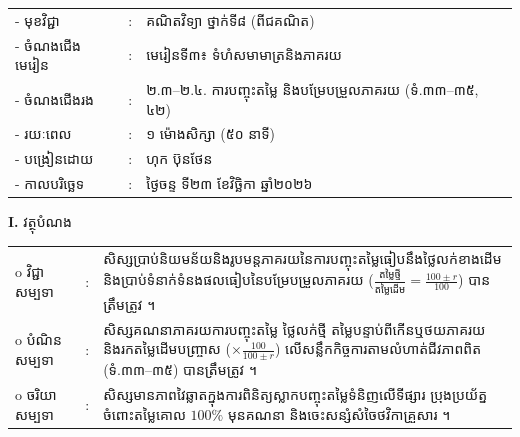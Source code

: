 \documentclass[a4paper,10pt]{article}
\newcommand{\wcirc}{{\CourierBullet\fontsize{9.5pt}{11pt}\selectfont o}}
\begin{document}
{\renewcommand{\arraystretch}{0.98}
\hspace*{3.1cm}%
\begin{tabular}{@{}l l L{11.0cm}@{}}
  - \hspace{0.35cm} មុខវិជ្ជា & : & គណិតវិទ្យា ថ្នាក់ទី៨ (ពីជគណិត) \\
  - \hspace{0.35cm} ចំណងជើងមេរៀន & : & មេរៀនទី៣៖ ទំហំសមាមាត្រនិងភាគរយ \\
  - \hspace{0.35cm} ចំណងជើងរង & : & ២.៣–២.៤. ការបញ្ចុះតម្លៃ និងបម្រែបម្រួលភាគរយ (ទំ.៣៣–៣៥, ៤២) \\
  - \hspace{0.35cm} រយៈពេល & : & ១ ម៉ោងសិក្សា (៥០ នាទី) \\
  - \hspace{0.35cm} បង្រៀនដោយ & : & ហុក ប៊ុនថែន \\
  - \hspace{0.35cm} កាលបរិច្ឆេទ & : & ថ្ងៃចន្ទ ទី២៣ ខែវិច្ឆិកា ឆ្នាំ២០២៦ \\
\end{tabular}

\vspace{2pt}

\textbf{I.} {\muol វត្ថុបំណង}\\[1pt]
\hspace*{0.55cm}%
\begin{tabular}{@{}l l L{14.2cm}@{}}
  \wcirc \hspace{0.25cm} វិជ្ជាសម្បទា & : & សិស្សប្រាប់និយមន័យនិងរូបមន្តភាគរយនៃការបញ្ចុះតម្លៃធៀបនឹងថ្លៃលក់ខាងដើម និងប្រាប់ទំនាក់ទំនងផលធៀបនៃបម្រែបម្រួលភាគរយ ($\frac{\text{តម្លៃថ្មី}}{\text{តម្លៃដើម}} = \frac{100 \pm r}{100}$) បានត្រឹមត្រូវ ។ \\
  \wcirc \hspace{0.25cm} បំណិនសម្បទា & : & សិស្សគណនាភាគរយការបញ្ចុះតម្លៃ ថ្លៃលក់ថ្មី តម្លៃបន្ទាប់ពីកើនឬថយភាគរយ និងរកតម្លៃដើមបញ្ច្រាស ($\times\frac{100}{100\pm r}$) លើសន្លឹកកិច្ចការតាមលំហាត់ជីវភាពពិត (ទំ.៣៣–៣៥) បានត្រឹមត្រូវ ។ \\
  \wcirc \hspace{0.25cm} ចរិយាសម្បទា & : & សិស្សមានភាពវៃឆ្លាតក្នុងការពិនិត្យស្លាកបញ្ចុះតម្លៃទំនិញលើទីផ្សារ ប្រុងប្រយ័ត្នចំពោះតម្លៃគោល $100\%$ មុនគណនា និងចេះសន្សំសំចៃថវិកាគ្រួសារ ។ \\
\end{tabular}

\vspace{2pt}

}
\end{document}
